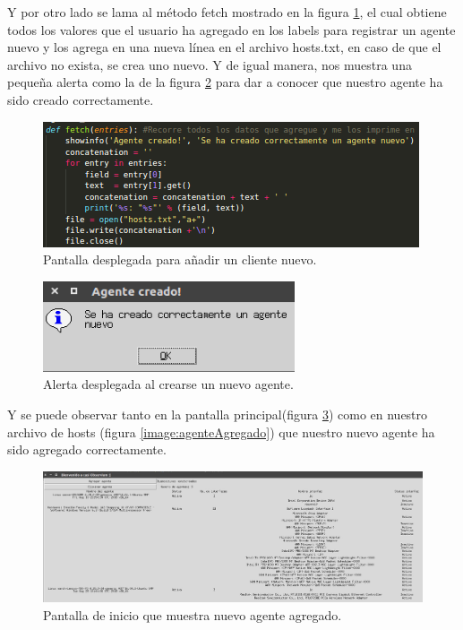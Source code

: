Y por otro lado se lama al método fetch mostrado en la figura \ref{image:add3}, el cual obtiene todos los valores que el usuario ha agregado en los labels para registrar un agente nuevo y los agrega en una nueva línea en el archivo hosts.txt, en caso de que el archivo no exista, se crea uno nuevo. Y de igual manera, nos muestra una pequeña alerta como la de la figura \ref{image:alerta} para dar a conocer que nuestro agente ha sido creado correctamente.
\FloatBarrier
\begin{figure}[htbp!]
		\centering
	\includegraphics[width=.6 \textwidth]{images/add3}
		\caption{Pantalla desplegada para añadir un cliente nuevo.}		\label{image:add3}
\end{figure}
\FloatBarrier

\FloatBarrier
\begin{figure}[htbp!]
		\centering
	\includegraphics[width=.4 \textwidth]{images/addAlerta}
		\caption{Alerta desplegada al crearse un nuevo agente.}		\label{image:alerta}
\end{figure}
\FloatBarrier

Y se puede observar tanto en la pantalla principal(figura \ref{image:principalA}) como en nuestro archivo de hosts (figura \ref{image:agenteAgregado}) que nuestro nuevo agente ha sido agregado correctamente.

\FloatBarrier
\begin{figure}[htbp!]
		\centering
	\includegraphics[width=1.1 \textwidth]{images/principalA}
		\caption{Pantalla de inicio que muestra nuevo agente agregado.}		\label{image:principalA}
\end{figure}
\FloatBarrier

